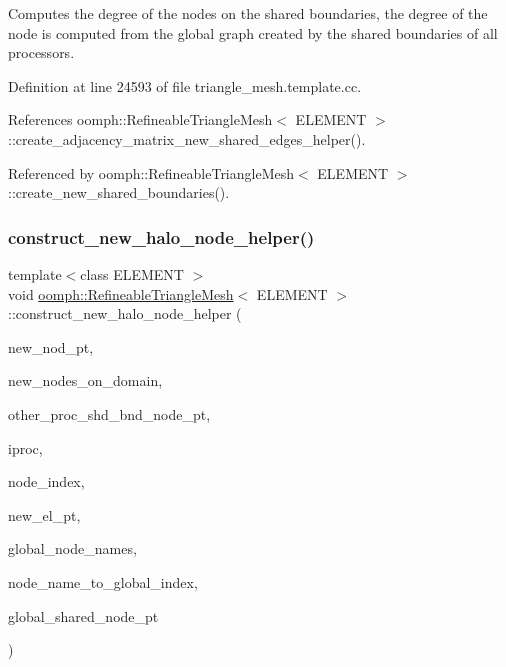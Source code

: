 Computes the degree of the nodes on the shared boundaries, the degree of the node is computed from the global graph created by the shared boundaries of all processors. 



Definition at line 24593 of file triangle\+\_\+mesh.\+template.\+cc.



References oomph\+::\+Refineable\+Triangle\+Mesh$<$ E\+L\+E\+M\+E\+N\+T $>$\+::create\+\_\+adjacency\+\_\+matrix\+\_\+new\+\_\+shared\+\_\+edges\+\_\+helper().



Referenced by oomph\+::\+Refineable\+Triangle\+Mesh$<$ E\+L\+E\+M\+E\+N\+T $>$\+::create\+\_\+new\+\_\+shared\+\_\+boundaries().

\mbox{\label{classoomph_1_1RefineableTriangleMesh_a19f9fe6c36b1be3c4ede935c2ad12fcc}} 
\subsubsection{\texorpdfstring{construct\+\_\+new\+\_\+halo\+\_\+node\+\_\+helper()}{construct\_new\_halo\_node\_helper()}}
{\footnotesize\ttfamily template$<$class E\+L\+E\+M\+E\+NT $>$ \\
void \hyperlink{classoomph_1_1RefineableTriangleMesh}{oomph\+::\+Refineable\+Triangle\+Mesh}$<$ E\+L\+E\+M\+E\+NT $>$\+::construct\+\_\+new\+\_\+halo\+\_\+node\+\_\+helper (\begin{DoxyParamCaption}\item[{Node $\ast$\&}]{new\+\_\+nod\+\_\+pt,  }\item[{Vector$<$ Node $\ast$$>$ \&}]{new\+\_\+nodes\+\_\+on\+\_\+domain,  }\item[{Vector$<$ Vector$<$ Vector$<$ std\+::map$<$ unsigned, Node $\ast$$>$ $>$ $>$ $>$ \&}]{other\+\_\+proc\+\_\+shd\+\_\+bnd\+\_\+node\+\_\+pt,  }\item[{unsigned \&}]{iproc,  }\item[{unsigned \&}]{node\+\_\+index,  }\item[{Finite\+Element $\ast$const \&}]{new\+\_\+el\+\_\+pt,  }\item[{Vector$<$ Vector$<$ Vector$<$ unsigned $>$ $>$ $>$ \&}]{global\+\_\+node\+\_\+names,  }\item[{std\+::map$<$ Vector$<$ unsigned $>$, unsigned $>$ \&}]{node\+\_\+name\+\_\+to\+\_\+global\+\_\+index,  }\item[{Vector$<$ Node $\ast$$>$ \&}]{global\+\_\+shared\+\_\+node\+\_\+pt }\end{DoxyParamCaption})\hspace{0.3cm}{\ttfamily [protected]}}



